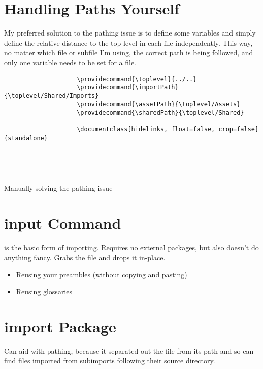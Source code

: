 \documentclass[hidelinks]{article}
\begin{document}
    \section{Handling Paths Yourself}
        My preferred solution to the pathing issue is to define some variables and simply define the relative distance to the top level in each file independently.
        This way, no matter which file or subfile I'm using, the correct path is being followed, and only one variable needs to be set for a file.
        \begin{listing}[H]
            \begin{centering}
                \begin{verbatim}
                    \providecommand{\toplevel}{../..}
                    \providecommand{\importPath}{\toplevel/Shared/Imports}
                    \providecommand{\assetPath}{\toplevel/Assets}
                    \providecommand{\sharedPath}{\toplevel/Shared}

                    \documentclass[hidelinks, float=false, crop=false]{standalone}

                    
                    
                    
                \end{verbatim}
                \caption{Manually solving the pathing issue}
                \label{lst:bibliography}
            \end{centering}
        \end{listing}

    \section{input Command}
        \texttt{} is the basic form of importing. Requires no external packages, but also doesn't do anything fancy.
        Grabs the file and drops it in-place.
        \begin{itemize}
            \item Reusing your preambles (without copying and pasting)
            \item Reusing glossaries
        \end{itemize}
    \section{import Package}
        Can aid with pathing, because it separated out the file from its path and so can find files imported from subimports following their source directory.
\end{document}
